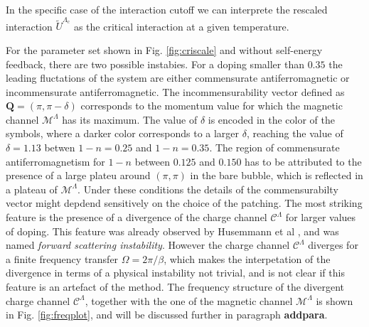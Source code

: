 In the specific case of the interaction cutoff we can interprete the rescaled interaction $\tilde U^{\Lambda_\mathrm{c}}$ as the critical interaction at a given temperature.

For the parameter set shown in Fig. \ref{fig:criscale} and without self-energy feedback, there are two possible instabies. 
For a doping smaller than $0.35$ the leading fluctations of the system are either commensurate antiferromagnetic or incommensurate antiferromagnetic. 
The incommensurability vector defined as $\mathbf{Q}=(\pi,\pi-\delta)$ corresponds to the momentum value for which the magnetic channel $\mathcal{M}^\Lambda$ has its maximum. The value of $\delta$ is encoded in the color of the symbols, where a darker color corresponds to a larger $\delta$, reaching the value of $\delta=1.13$ betwen $1-n=0.25$ and $1-n=0.35$. 
The region of commensurate antiferromagnetism for $1-n$ between $0.125$ and $0.150$ has to be attributed to the presence of a large plateu around $(\pi,\pi)$ in the bare bubble, which is reflected in a plateau of $\mathcal{M}^\Lambda$. 
Under these conditions the details of the commensurabilty vector might depdend sensitively on the choice of the patching.
The most striking feature is the presence of a divergence of the charge channel $\mathcal{C}^\Lambda$ for larger values of doping. 
This feature was already observed by Husemmann et al , and was named \textit{forward scattering instability}. 
However the charge channel $\mathcal{C}^\Lambda$ diverges for a finite frequency transfer $\Omega=2\pi/\beta$, which makes the interpetation of the divergence in terms of a physical instability not trivial, and is not clear if this feature is an artefact of the method. 
The frequency structure of the divergent charge channel $\mathcal{C}^\Lambda$, together with the one of the magnetic channel $\mathcal{M}^\Lambda$ is shown in Fig. \ref{fig:freqplot}, and will be discussed further in paragraph \textbf{addpara}.

